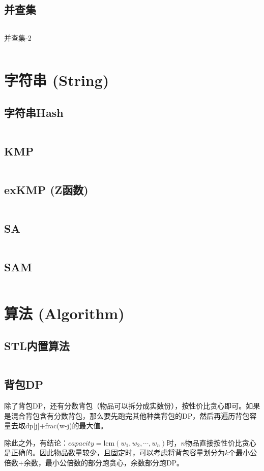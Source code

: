 \documentclass[openany,a4paper]{book}
\begin{document}
\section{并查集}
\inputminted{cpp}{DataStructure/disjointSetUnion.h}
并查集-2
\inputminted{cpp}{DataStructure/DSU.h}

\chapter{字符串 (String)}

\section{字符串Hash}
\inputminted{cpp}{String/hash.h}

\section{KMP}
\inputminted{cpp}{String/kmp.h}

\section{exKMP (Z函数)}
\inputminted{cpp}{String/exkmp.hpp}

\section{SA}
\inputminted{cpp}{String/SA.h}
\section{SAM}
\inputminted{cpp}{String/SAM.h}

\chapter{算法 (Algorithm)}

\section{STL内置算法}
\inputminted{cpp}{Algorithm/STL.h}

\section{背包DP}
除了背包DP，还有分数背包（物品可以拆分成实数份），按性价比贪心即可。如果是混合背包含有分数背包，那么要先跑完其他种类背包的DP，然后再遍历背包容量去取dp[j]+frac(w-j)的最大值。
\par 除此之外，有结论：$capacity=\mathrm{lcm}(w_1,w_2,\cdots,w_n)$时，$n$物品直接按性价比贪心是正确的。因此物品数量较少，且固定时，可以考虑将背包容量划分为$k$个最小公倍数+余数，最小公倍数的部分跑贪心，余数部分跑DP。
\inputminted{cpp}{Algorithm/bagDP.h}
\end{document}
